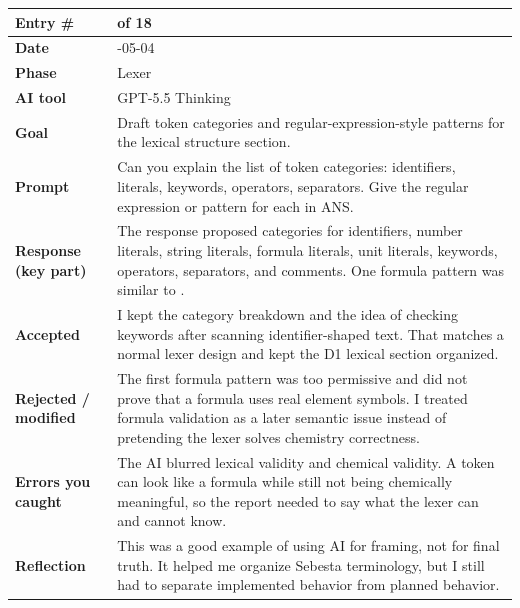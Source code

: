 \documentclass[11pt,a4paper]{article}
\newcommand{\code}[1]{\texttt{\detokenize{#1}}}
\newcommand{\entrygap}{\vspace{8pt}}
\newenvironment{journalentry}{%
  \begin{center}\small\renewcommand{\arraystretch}{1.22}%
  \begin{tabular}{|>{\columncolor{anscodebg}\bfseries}p{3.0cm}|>{\RaggedRight\arraybackslash}p{12.25cm}|}%
  \hline
}{%
  \end{tabular}\end{center}\entrygap
}
\begin{document}
\begin{journalentry}
Entry \# & 2 of 18 \\ \hline
Date & 2026-05-04 \\ \hline
Phase & Lexer \\ \hline
AI tool & GPT-5.5 Thinking \\ \hline
Goal & Draft token categories and regular-expression-style patterns for the lexical structure section. \\ \hline
Prompt & Can you explain the list of token categories: identifiers, literals, keywords, operators, separators. Give the regular expression or pattern for each in ANS. \\ \hline
Response (key part) & The response proposed categories for identifiers, number literals, string literals, formula literals, unit literals, keywords, operators, separators, and comments. One formula pattern was similar to \code{(?:[A-Z][a-z]?\d*)+}. \\ \hline
Accepted & I kept the category breakdown and the idea of checking keywords after scanning identifier-shaped text. That matches a normal lexer design and kept the D1 lexical section organized. \\ \hline
Rejected / modified & The first formula pattern was too permissive and did not prove that a formula uses real element symbols. I treated formula validation as a later semantic issue instead of pretending the lexer solves chemistry correctness. \\ \hline
Errors you caught & The AI blurred lexical validity and chemical validity. A token can look like a formula while still not being chemically meaningful, so the report needed to say what the lexer can and cannot know. \\ \hline
Reflection & This was a good example of using AI for framing, not for final truth. It helped me organize Sebesta terminology, but I still had to separate implemented behavior from planned behavior. \\ \hline
\end{journalentry}
\end{document}
